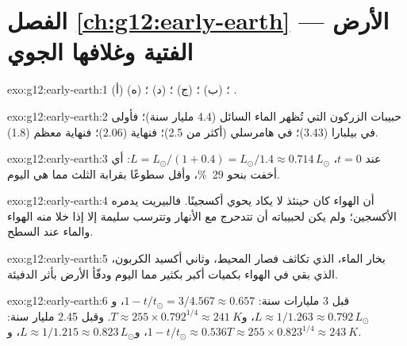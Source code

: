 \section*{الفصل \ref{ch:g12:early-earth} --- الأرض الفتية وغلافها الجوي}

\begin{solution}{exo:g12:early-earth:1}
(أ) ؛ (ب) ؛ (ج) ؛ (د) ؛ (ه) .
\end{solution}

\begin{solution}{exo:g12:early-earth:2}
حبيبات الزركون التي تُظهر الماء السائل (4.4 مليار سنة)؛ فأولى 
في بيلبارا (3.43)؛  في هامرسلي (أكثر من
2.5)؛ فنهاية  (2.06)؛ فنهاية معظم  (1.8).
\end{solution}

\begin{solution}{exo:g12:early-earth:3}
عند $t = 0$، $L = L_\odot/(1 + 0.4) = L_\odot/1.4 \approx 0.714\,L_\odot$:
أي أخفت بنحو \qty{29}{\percent}، وأقل سطوعًا بقرابة الثلث مما هي اليوم.
\end{solution}

\begin{solution}{exo:g12:early-earth:4}
أن الهواء كان حينئذ لا يكاد يحوي أكسجينًا. فالبيريت يدمره الأكسجين؛
ولم يكن لحبيباته أن تتدحرج مع الأنهار وتترسب سليمة إلا إذا خلا منه
الهواء والماء عند السطح.
\end{solution}

\begin{solution}{exo:g12:early-earth:5}
بخار الماء، الذي تكاثف فصار المحيط، وثاني أكسيد الكربون، الذي
بقي في الهواء بكميات أكبر بكثير مما اليوم ودفّأ الأرض
بأثر الدفيئة.
\end{solution}

\begin{solution}{exo:g12:early-earth:6}
قبل 3 مليارات سنة: $1 - t/t_\odot = 3/4.567 \approx 0.657$، و$L \approx
1/1.263 \approx 0.792\,L_\odot$، و$T \approx 255 \times 0.792^{1/4} \approx
\qty{241}{K}$. وقبل 2.45 مليار سنة: $1 - t/t_\odot \approx 0.536$، و$L
\approx 1/1.215 \approx 0.823\,L_\odot$، و$T \approx 255 \times 0.823^{1/4}
\approx \qty{243}{K}$.
\end{solution}

